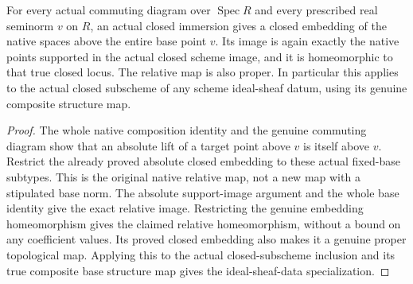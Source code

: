 \begin{theorem}
\label{scheme:relative-native-closed-immersion}
\leanok
{}
For every actual commuting diagram over $\operatorname{Spec}R$ and every
prescribed real seminorm $v$ on $R$, an actual closed immersion gives a
closed embedding of the native spaces above the entire base point $v$.
Its image is again exactly the native points supported in the actual
closed scheme image, and it is homeomorphic to that true closed locus. The relative map is also proper.
In particular this applies to the actual
closed subscheme of any scheme ideal-sheaf datum, using its genuine
composite structure map.
\end{theorem}
\begin{proof}
The whole native composition identity and the genuine commuting diagram
show that an absolute lift of a target point above $v$ is itself above
$v$. Restrict the already proved absolute closed embedding to these
actual fixed-base subtypes. This is the original native relative map,
not a new map with a stipulated base norm. The absolute support-image
argument and the whole base identity give the exact relative image.
Restricting the genuine embedding homeomorphism gives the claimed
relative homeomorphism, without a bound on any coefficient values. Its
proved closed embedding
also makes it a genuine proper topological map. Applying this to the
actual closed-subscheme inclusion and its true composite base structure
map gives the ideal-sheaf-data specialization.
\end{proof}
